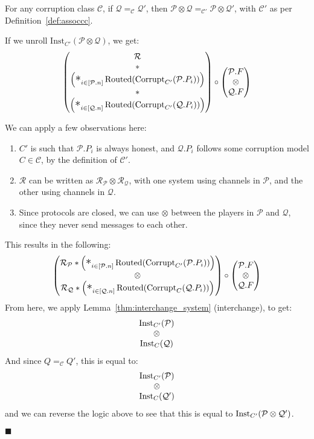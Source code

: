 \begin{lemma}
For any corruption class $\mathcal{C}$, if $\mathcal{Q} =_\mathcal{C} \mathcal{Q}'$,
then $\mathcal{P} \otimes \mathcal{Q} =_\mathcal{C'} \mathcal{P} \otimes \mathcal{Q}'$,
with $\mathcal{C}'$ as per Definition~\ref{def:assoccc}.

 If we unroll $\text{Inst}_{C'}(\mathcal{P} \otimes \mathcal{Q})$, we get:
$$
\begin{pmatrix}
\mathcal{R}\cr
*\cr
\left(\bigast_{i \in [\mathcal{P}.n]} \tx{Routed}(\tx{Corrupt}_{C'}(\mathcal{P}.P_i))\right)\cr
*\cr
\left(\bigast_{i \in [\mathcal{Q}.n]} \tx{Routed}(\tx{Corrupt}_{C'}(\mathcal{Q}.P_i))\right)
\end{pmatrix}
\circ
\begin{pmatrix}
\mathcal{P}.F\cr
\otimes\cr
\mathcal{Q}.F\cr
\end{pmatrix}
$$

We can apply a few observations here:
\begin{enumerate}
  \item $C'$ is such that $\mathcal{P}.P_i$ is always honest, and $\mathcal{Q}.P_i$ follows
  some corruption model $C \in \mathcal{C}$, by the definition of $\mathcal{C}'$.
  \item $\mathcal{R}$ can be written as $\mathcal{R}_\mathcal{P} \otimes \mathcal{R}_\mathcal{Q}$,
  with one system using channels in $\mathcal{P}$, and the other using channels in $\mathcal{Q}$.
  \item Since protocols are closed, we can use $\otimes$ between the players in $\mathcal{P}$ and $\mathcal{Q}$,
  since they never send messages to each other.
\end{enumerate}
This results in the following:
$$
\begin{pmatrix}
\mathcal{R}_{\mathcal{P}} * \left(\bigast_{i \in [\mathcal{P}.n]} \tx{Routed}(\tx{Corrupt}_{C'}(\mathcal{P}.P_i))\right)\cr
\otimes\cr
\mathcal{R}_{\mathcal{Q}} * \left(\bigast_{i \in [\mathcal{Q}.n]} \tx{Routed}(\tx{Corrupt}_{C}(\mathcal{Q}.P_i))\right)
\end{pmatrix}
\circ
\begin{pmatrix}
\mathcal{P}.F\cr
\otimes\cr
\mathcal{Q}.F\cr
\end{pmatrix}
$$
From here, we apply Lemma~\ref{thm:interchange_system} (interchange), to get:
$$
\begin{matrix}
\text{Inst}_{C'}(\mathcal{P})\cr
\otimes\cr
\text{Inst}_{C}(\mathcal{Q})\cr
\end{matrix}
$$
And since $Q =_\mathcal{C} Q'$, this is equal to:
$$
\begin{matrix}
\text{Inst}_{C'}(\mathcal{P})\cr
\otimes\cr
\text{Inst}_{C}(\mathcal{Q'})\cr
\end{matrix}
$$
and we can reverse the logic above to see that this is equal
to $\text{Inst}_{C'}(\mathcal{P} \otimes \mathcal{Q}')$.

$\blacksquare$
\end{lemma}
